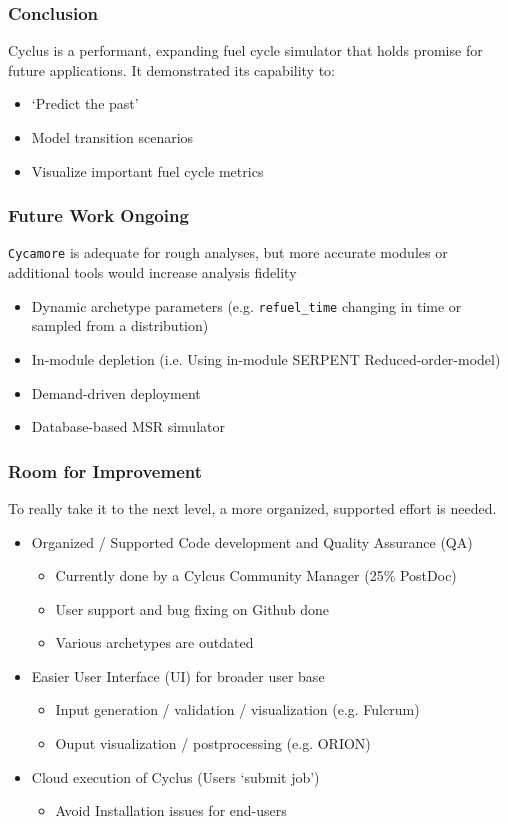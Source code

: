 \begin{frame}
    \frametitle{Conclusion}
    Cyclus is a performant, expanding fuel cycle simulator that holds promise for future applications. It demonstrated its capability to:
    \begin{itemize}
        \item `Predict the past'
        \item Model transition scenarios
        \item Visualize important fuel cycle metrics
    \end{itemize}
\end{frame}

\begin{frame}
    \frametitle{Future Work Ongoing}
    \texttt{Cycamore} is adequate for rough analyses, but more accurate
    modules or additional tools would increase analysis fidelity
    \begin{itemize}
        \item Dynamic archetype parameters (e.g. \texttt{refuel\_time}
                changing in time or sampled from a distribution)
        \item In-module depletion (i.e. Using in-module SERPENT Reduced-order-model)
        \item Demand-driven deployment \footnotemark
        \item Database-based MSR simulator
    \end{itemize}
\end{frame}


\begin{frame}
    \frametitle{Room for Improvement}
    To really take it to the next level, a more organized, supported
    effort is needed.
    \begin{itemize}
        \item Organized / Supported Code development and Quality Assurance (QA)
        \begin{itemize}
            \item Currently done by a Cylcus Community Manager (25\% PostDoc)
            \item User support and bug fixing on Github done
            \item Various archetypes are outdated
        \end{itemize}
        \item Easier User Interface (UI) for broader user base
        \begin{itemize}
            \item Input generation / validation / visualization (e.g. Fulcrum)
            \item Ouput visualization / postprocessing (e.g. ORION)
        \end{itemize}
        \item Cloud execution of Cyclus (Users `submit job')
        \begin{itemize}
            \item Avoid Installation issues for end-users
        \end{itemize}
    \end{itemize}
\end{frame}


